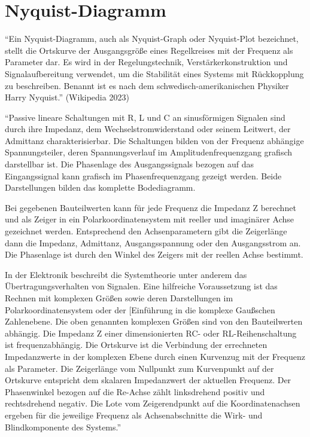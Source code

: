 \documentclass[
  ngerman,
  letterpaper,
]{scrbook}
\begin{document}
\section{Nyquist-Diagramm}\label{nyquist-diagramm}

``Ein Nyquist-Diagramm, auch als Nyquist-Graph oder Nyquist-Plot
bezeichnet, stellt die Ortskurve der Ausgangsgröße eines Regelkreises
mit der Frequenz als Parameter dar. Es wird in der Regelungstechnik,
Verstärkerkonstruktion und Signalaufbereitung verwendet, um die
Stabilität eines Systems mit Rückkopplung zu beschreiben. Benannt ist es
nach dem schwedisch-amerikanischen Physiker Harry Nyquist.'' (Wikipedia
2023)

``Passive lineare Schaltungen mit R, L und C an sinusförmigen Signalen
sind durch ihre Impedanz, dem Wechselstromwiderstand oder seinem
Leitwert, der Admittanz charakterisierbar. Die Schaltungen bilden von
der Frequenz abhängige Spannungsteiler, deren Spannungsverlauf im
Amplitudenfrequenzgang grafisch darstellbar ist. Die Phasenlage des
Ausgangssignals bezogen auf das Eingangssignal kann grafisch im
Phasenfrequenzgang gezeigt werden. Beide Darstellungen bilden das
komplette Bodediagramm.

Bei gegebenen Bauteilwerten kann für jede Frequenz die Impedanz Z
berechnet und als Zeiger in ein Polarkoordinatensystem mit reeller und
imaginärer Achse gezeichnet werden. Entsprechend den Achsenparametern
gibt die Zeigerlänge dann die Impedanz, Admittanz, Ausgangsspannung oder
den Ausgangsstrom an. Die Phasenlage ist durch den Winkel des Zeigers
mit der reellen Achse bestimmt.

In der Elektronik beschreibt die Systemtheorie unter anderem das
Übertragungsverhalten von Signalen. Eine hilfreiche Voraussetzung ist
das Rechnen mit komplexen Größen sowie deren Darstellungen im
Polarkoordinatensystem oder der {[}Einführung in die komplexe Gaußschen
Zahlenebene. Die oben genannten komplexen Größen sind von den
Bauteilwerten abhängig. Die Impedanz Z einer dimensionierten RC- oder
RL-Reihenschaltung ist frequenzabhängig. Die Ortskurve ist die
Verbindung der errechneten Impedanzwerte in der komplexen Ebene durch
einen Kurvenzug mit der Frequenz als Parameter. Die Zeigerlänge vom
Nullpunkt zum Kurvenpunkt auf der Ortskurve entspricht dem skalaren
Impedanzwert der aktuellen Frequenz. Der Phasenwinkel bezogen auf die
Re-Achse zählt linksdrehend positiv und rechtsdrehend negativ. Die Lote
vom Zeigerendpunkt auf die Koordinatenachsen ergeben für die jeweilige
Frequenz als Achsenabschnitte die Wirk- und Blindkomponente des
Systems.''
\end{document}
